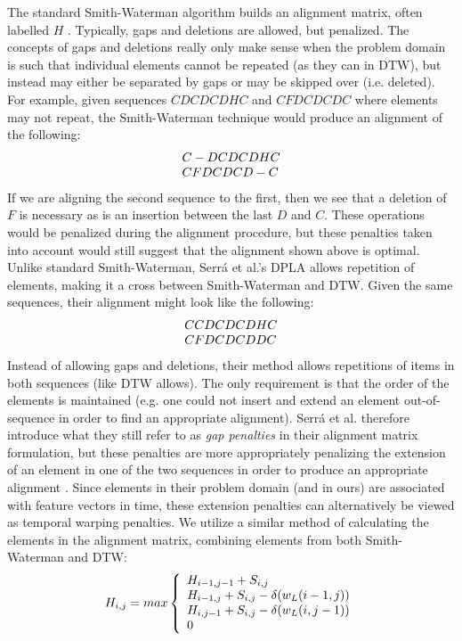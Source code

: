 \documentclass[12pt]{report} 	%
\numberwithin{figure}{chapter}
\numberwithin{table}{chapter}
\numberwithin{equation}{chapter}
\begin{document}
\begin{flushleft}
The standard Smith-Waterman algorithm builds an alignment matrix, often labelled $H$ \cite{smith1981textordfeminineidentification}. Typically, gaps and deletions are allowed, but penalized. The concepts of gaps and deletions really only make sense when the problem domain is such that individual elements cannot be repeated (as they can in DTW), but instead may either be separated by gaps or may be skipped over (i.e. deleted). For example, given sequences $CDCDCDHC$ and $CFDCDCDC$ where elements may not repeat, the Smith-Waterman technique would produce an alignment of the following:
\begin{equation}
\begin{array}{l l}
C-DCDCDHC\\
CFDCDCD-C
\end{array}
\end{equation}
If we are aligning the second sequence to the first, then we see that a deletion of $F$ is necessary as is an insertion between the last $D$ and $C$. These operations would be penalized during the alignment procedure, but these penalties taken into account would still suggest that the alignment shown above is optimal. Unlike standard Smith-Waterman, Serr\'a et al.'s DPLA allows repetition of elements, making it a cross between Smith-Waterman and DTW. Given the same sequences, their alignment might look like the following:
\begin{equation}
\begin{array}{l l}
CCDCDCDHC\\
CFDCDCDDC
\end{array}
\end{equation}
Instead of allowing gaps and deletions, their method allows repetitions of items in both sequences (like DTW allows). The only requirement is that the order of the elements is maintained (e.g. one could not insert and extend an element out-of-sequence in order to find an appropriate alignment). Serr\'a et al. therefore introduce what they still refer to as \textit{gap penalties} in their alignment matrix formulation, but these penalties are more appropriately penalizing the extension of an element in one of the two sequences in order to produce an appropriate alignment \cite{serra2008chroma}. Since elements in their problem domain (and in ours) are associated with feature vectors in time, these extension penalties can alternatively be viewed as temporal warping penalties. We utilize a similar method of calculating the elements in the alignment matrix, combining elements from both Smith-Waterman and DTW:
\begin{equation}
H_{i,j} = max\left\{ 
  \begin{array}{l l}
    H_{i-1,j-1}+S_{i,j}\\
    H_{i-1,j}+S_{i,j}-\delta(w_L(i-1,j))\\
    H_{i,j-1}+S_{i,j}-\delta(w_L(i,j-1))\\
    0
   \end{array} \right.
\end{equation}


\end{flushleft}
\end{document}
